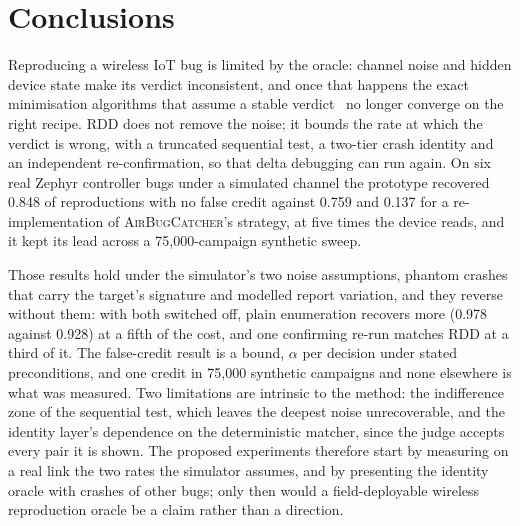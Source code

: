 \section{Conclusions}\label{sec:conclusions}

Reproducing a wireless IoT bug is limited by the oracle: channel noise and hidden
device state make its verdict inconsistent, and once that happens the exact
minimisation algorithms that assume a stable verdict~\cite{ddmin2002} no longer
converge on the right recipe. RDD does not remove the noise; it bounds the rate
at which the verdict is wrong, with a truncated sequential test, a two-tier crash
identity and an independent re-confirmation, so that delta debugging can run
again. On six real Zephyr controller bugs under a simulated channel the prototype
recovered 0.848 of reproductions with no false credit against 0.759 and 0.137
for a re-implementation of \textsc{AirBugCatcher}'s strategy, at five times the
device reads, and it kept its lead across a 75,000-campaign synthetic sweep.

Those results hold under the simulator's two noise assumptions, phantom crashes
that carry the target's signature and modelled report variation, and they
reverse without them: with both switched off, plain enumeration recovers more (0.978 against 0.928) at a
fifth of the cost, and one confirming re-run matches RDD at a third of it. The false-credit result is a bound,
$\alpha$ per decision under stated preconditions, and one credit in 75,000 synthetic campaigns and none elsewhere is what was
measured.
Two limitations are intrinsic to the method: the indifference zone of the
sequential test, which leaves the deepest noise unrecoverable, and the identity
layer's dependence on the deterministic matcher, since the judge accepts every
pair it is shown. The proposed experiments therefore start by measuring on a real
link the two rates the simulator assumes, and by presenting the identity oracle
with crashes of other bugs; only then would a field-deployable wireless
reproduction oracle be a claim rather than a direction.
